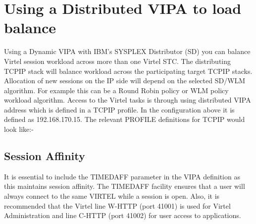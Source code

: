 \documentclass[letterpaper,10pt,english]{sphinxmanual}
\begin{document}
\section{Using a Distributed VIPA to load balance}
\label{\detokenize{connectivity_guide:using-a-distributed-vipa-to-load-balance}}\label{\detokenize{connectivity_guide:index-173}}
Using a Dynamic VIPA with IBM’s SYSPLEX Distributor (SD) you can balance Virtel session workload across more than one Virtel STC. The distributing TCPIP stack will balance workload across the participating target TCPIP stacks. Allocation of new sessions on the IP side will depend on the selected SD/WLM algorithm. For example this can be a Round Robin policy or WLM policy workload algorithm. Access to the Virtel tasks is through using distributed VIPA address which is defined in a TCPIP profile. In the configuration above it is defined as
192.168.170.15. The relevant PROFILE definitions for TCPIP would look like:-

\begin{sphinxVerbatim}[commandchars=\\\{\}]
     
    
      
 
\end{sphinxVerbatim}

\ignorespaces 

\subsection{Session Affinity}
\label{\detokenize{connectivity_guide:session-affinity}}\label{\detokenize{connectivity_guide:index-174}}
It is essential to include the TIMEDAFF parameter in the VIPA definition as this maintains session affinity. The TIMEDAFF facility ensures that a user will always connect to the same VIRTEL while a session is open. Also, it is recommended that the Virtel line W-HTTP (port 41001) is used for Virtel Administration and line C-HTTP (port 41002) for user access
to applications.
\end{document}
